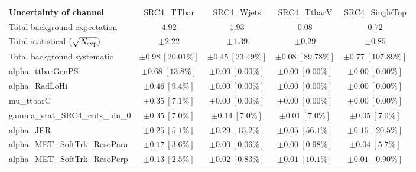 
\begin{sidewaystable}
\begin{center}
\setlength{\tabcolsep}{0.0pc}
\begin{tabular*}{\textwidth}{@{\extracolsep{\fill}}lcccc}
\noalign{\smallskip}\hline\noalign{\smallskip}
{\bf Uncertainty of channel}                                    & SRC4\_TTbar            & SRC4\_Wjets            & SRC4\_TtbarV            & SRC4\_SingleTop            \\
\noalign{\smallskip}\hline\noalign{\smallskip}
Total background expectation             &  $4.92$        &  $1.93$        &  $0.08$        &  $0.72$       \\
\noalign{\smallskip}\hline\noalign{\smallskip}
Total statistical $(\sqrt{N_{\rm exp}})$              & $\pm 2.22$        & $\pm 1.39$        & $\pm 0.29$        & $\pm 0.85$       \\
Total background systematic               & $\pm 0.98\ [20.01\%] $        & $\pm 0.45\ [23.49\%] $        & $\pm 0.08\ [89.78\%] $        & $\pm 0.77\ [107.89\%] $             \\
\noalign{\smallskip}\hline\noalign{\smallskip}
\noalign{\smallskip}\hline\noalign{\smallskip}
alpha\_ttbarGenPS         & $\pm 0.68\ [13.8\%] $          & $\pm 0.00\ [0.00\%] $          & $\pm 0.00\ [0.00\%] $          & $\pm 0.00\ [0.00\%] $       \\
alpha\_RadLoHi         & $\pm 0.46\ [9.4\%] $          & $\pm 0.00\ [0.00\%] $          & $\pm 0.00\ [0.00\%] $          & $\pm 0.00\ [0.00\%] $       \\
mu\_ttbarC         & $\pm 0.35\ [7.1\%] $          & $\pm 0.00\ [0.00\%] $          & $\pm 0.00\ [0.00\%] $          & $\pm 0.00\ [0.00\%] $       \\
gamma\_stat\_SRC4\_cuts\_bin\_0         & $\pm 0.35\ [7.0\%] $          & $\pm 0.14\ [7.0\%] $          & $\pm 0.01\ [7.0\%] $          & $\pm 0.05\ [7.0\%] $       \\
alpha\_JER         & $\pm 0.25\ [5.1\%] $          & $\pm 0.29\ [15.2\%] $          & $\pm 0.05\ [56.1\%] $          & $\pm 0.15\ [20.5\%] $       \\
alpha\_MET\_SoftTrk\_ResoPara         & $\pm 0.17\ [3.6\%] $          & $\pm 0.00\ [0.06\%] $          & $\pm 0.00\ [0.98\%] $          & $\pm 0.04\ [5.7\%] $       \\
alpha\_MET\_SoftTrk\_ResoPerp         & $\pm 0.13\ [2.5\%] $          & $\pm 0.02\ [0.83\%] $          & $\pm 0.01\ [10.1\%] $          & $\pm 0.01\ [0.90\%] $       \\

\end{tabular*}
\end{center}
\end{sidewaystable}
